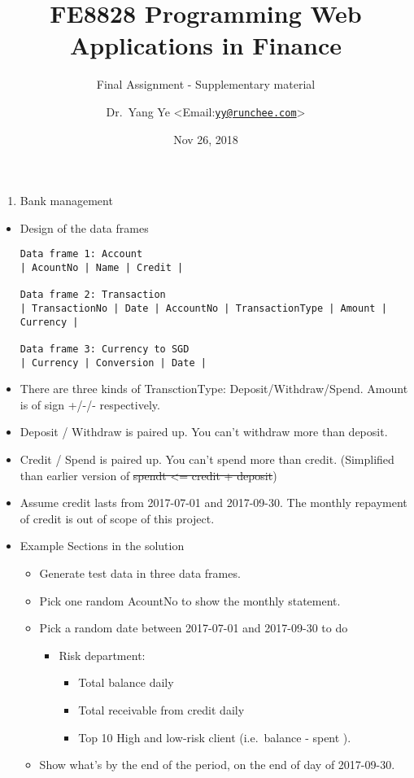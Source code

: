 \documentclass[]{article}
\title{FE8828 Programming Web Applications in Finance}
\subtitle{Final Assignment - Supplementary material}
\author{Dr.~Yang Ye
\textless{}Email:\href{mailto:yy@runchee.com}{\nolinkurl{yy@runchee.com}}\textgreater{}}
\date{Nov 26, 2018}
\providecommand{\tightlist}{%
  \setlength{\itemsep}{0pt}\setlength{\parskip}{0pt}}
\begin{document}
\maketitle

\begin{enumerate}
\def\labelenumi{\arabic{enumi}.}
\tightlist
\item
  Bank management
\end{enumerate}

\begin{itemize}
\item
  Design of the data frames

\begin{verbatim}
Data frame 1: Account 
| AcountNo | Name | Credit |

Data frame 2: Transaction
| TransactionNo | Date | AccountNo | TransactionType | Amount | Currency |

Data frame 3: Currency to SGD
| Currency | Conversion | Date |
\end{verbatim}
\item
  There are three kinds of TransctionType: Deposit/Withdraw/Spend.
  Amount is of sign +/-/- respectively.
\item
  Deposit / Withdraw is paired up. You can't withdraw more than deposit.
\item
  Credit / Spend is paired up. You can't spend more than credit.
  (Simplified than earlier version of \sout{spendt \textless{}= credit +
  deposit})
\item
  Assume credit lasts from 2017-07-01 and 2017-09-30. The monthly
  repayment of credit is out of scope of this project.
\item
  Example Sections in the solution

  \begin{itemize}
  \tightlist
  \item
    Generate test data in three data frames.
  \item
    Pick one random AcountNo to show the monthly statement.
  \item
    Pick a random date between 2017-07-01 and 2017-09-30 to do

    \begin{itemize}
    \tightlist
    \item
      Risk department:

      \begin{itemize}
      \tightlist
      \item
        Total balance daily
      \item
        Total receivable from credit daily
      \item
        Top 10 High and low-risk client (i.e.~balance - spent ).
      \end{itemize}
    \end{itemize}
  \item
    Show what's by the end of the period, on the end of day of
    2017-09-30.


\end{itemize}
\end{itemize}
\end{document}
